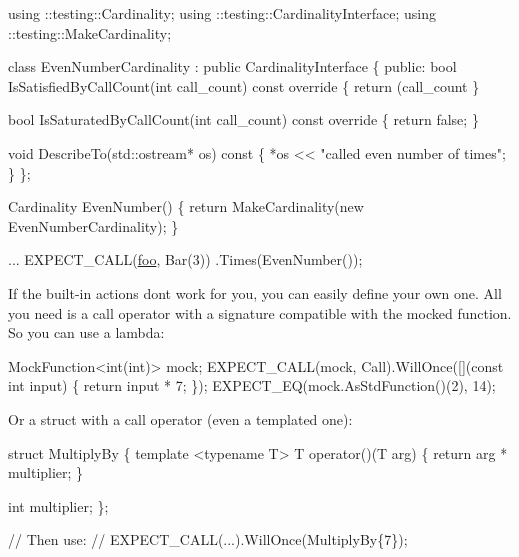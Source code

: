 \begin{DoxyCode}
using ::testing::Cardinality;
using ::testing::CardinalityInterface;
using ::testing::MakeCardinality;

\textcolor{keyword}{class }EvenNumberCardinality : \textcolor{keyword}{public} CardinalityInterface \{
 \textcolor{keyword}{public}:
  \textcolor{keywordtype}{bool} IsSatisfiedByCallCount(\textcolor{keywordtype}{int} call\_count)\textcolor{keyword}{ const override }\{
    \textcolor{keywordflow}{return} (call\_count %
  \}

  \textcolor{keywordtype}{bool} IsSaturatedByCallCount(\textcolor{keywordtype}{int} call\_count)\textcolor{keyword}{ const override }\{
    \textcolor{keywordflow}{return} \textcolor{keyword}{false};
  \}

  \textcolor{keywordtype}{void} DescribeTo(std::ostream* os)\textcolor{keyword}{ const }\{
    *os << \textcolor{stringliteral}{"called even number of times"};
  \}
\};

Cardinality EvenNumber() \{
  \textcolor{keywordflow}{return} MakeCardinality(\textcolor{keyword}{new} EvenNumberCardinality);
\}

...
  EXPECT\_CALL(\mbox{\hyperlink{namespacefoo}{foo}}, Bar(3))
      .Times(EvenNumber());
\end{DoxyCode}


If the built-\/in actions don\textquotesingle{}t work for you, you can easily define your own one. All you need is a call operator with a signature compatible with the mocked function. So you can use a lambda\+:


\begin{DoxyCode}
MockFunction<int(int)> mock;
EXPECT\_CALL(mock, Call).WillOnce([](\textcolor{keyword}{const} \textcolor{keywordtype}{int} input) \{ \textcolor{keywordflow}{return} input * 7; \});
EXPECT\_EQ(mock.AsStdFunction()(2), 14);
\end{DoxyCode}


Or a struct with a call operator (even a templated one)\+:


\begin{DoxyCode}
\textcolor{keyword}{struct }MultiplyBy \{
  \textcolor{keyword}{template} <\textcolor{keyword}{typename} T>
  T operator()(T arg) \{ \textcolor{keywordflow}{return} arg * multiplier; \}

  \textcolor{keywordtype}{int} multiplier;
\};

\textcolor{comment}{// Then use:}
\textcolor{comment}{// EXPECT\_CALL(...).WillOnce(MultiplyBy\{7\});}
\end{DoxyCode}


